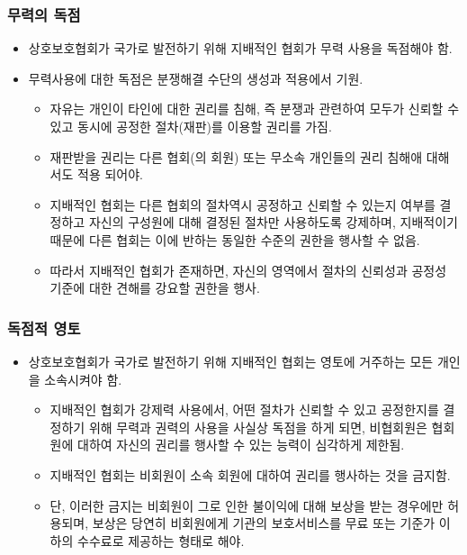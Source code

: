 \documentclass[aspectratio=169,xcolor=dvipsnames,handout]{beamer}
\begin{document}
\begin{frame}[<+->]
\frametitle{무력의 독점}
    \begin{itemize}
        \item  상호보호협회가 국가로 발전하기 위해 지배적인 협회가 무력 사용을 독점해야 함.
        \item 무력사용에 대한 독점은 분쟁해결 수단의 생성과 적용에서 기원.
        \begin{itemize}
             \item 자유는 개인이 타인에 대한 권리를 침해, 즉 분쟁과 관련하여 모두가 신뢰할 수 있고 동시에 공정한 절차(재판)를 이용할 권리를 가짐.
             \item 재판받을 권리는 다른 협회(의 회원) 또는 무소속 개인들의 권리 침해애 대해서도 적용 되어야.
             \item 지배적인 협회는 다른 협회의 절차역시 공정하고 신뢰할 수 있는지 여부를 결정하고 자신의 구성원에 대해 결정된 절차만 사용하도록 강제하며, 지배적이기 때문에 다른 협회는 이에 반하는 동일한 수준의 권한을 행사할 수 없음.
             \item 따라서 지배적인 협회가 존재하면, 자신의 영역에서 절차의 신뢰성과 공정성 기준에 대한 견해를 강요할 권한을 행사.
        \end{itemize}
    \end{itemize}
\end{frame}

\begin{frame}[<+->]
\frametitle{독점적 영토}
    \begin{itemize}
        \item  상호보호협회가 국가로 발전하기 위해 지배적인 협회는 영토에 거주하는 모든 개인을 소속시켜야 함.
        \begin{itemize}
            \item 지배적인 협회가 강제력 사용에서, 어떤 절차가 신뢰할 수 있고 공정한지를 결정하기 위해 무력과 권력의 사용을 사실상 독점을 하게 되면, 비협회원은 협회원에 대하여 자신의 권리를 행사할 수 있는 능력이 심각하게 제한됨.
             \item 지배적인 협회는 비회원이 소속 회원에 대하여 권리를 행사하는 것을 금지함.
             \item  단, 이러한 금지는 비회원이 그로 인한 불이익에 대해 보상을 받는 경우에만 허용되며, 보상은 당연히 비회원에게 기관의 보호서비스를 무료 또는 기준가 이하의 수수료로 제공하는 형태로 해야.
        \end{itemize}
    \end{itemize}
\end{frame}
\end{document}
